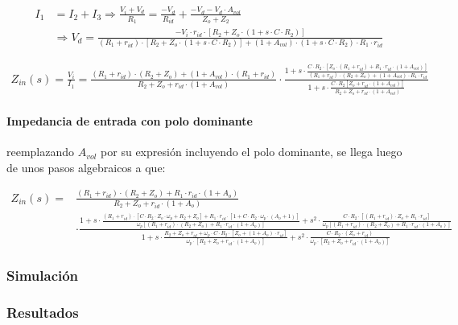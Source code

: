 \begin{align*}
	I_1 & = I_2 + I_3 \Rightarrow \frac{V_i + V_d}{R_1} = \frac{-V_d}{R_{id}} + \frac{-V_d - V_d \cdot A_{vol}}{Z_o + Z_2}\\
	& \Rightarrow
	V_d = \frac{- V_i \cdot r_{id} \cdot \left[ R_2 + Z_o \cdot (1 + s \cdot C \cdot R_2) \right]}{(R_1 + r_{id}) \cdot \left[R_2 + Z_o \cdot (1 + s \cdot C \cdot R_2) \right] + (1 + A_{vol}) \cdot ( 1 + s \cdot C \cdot R_2) \cdot R_1 \cdot r_{id}}
\end{align*}

\begin{align}
	Z_{in}(s) = \frac{V_i}{I_1} = \frac{(R_1 + r_{id}) \cdot (R_2 + Z_o) + (1 + A_{vol}) \cdot (R_1 + r_{id})}{R_2 + Z_o + r_{id} \cdot(1 + A_{vol})} \cdot \frac{1 + s \cdot \frac{C \cdot R_2 \cdot \left[ Z_o \cdot (R_1 + r_{id}) + R_1 \cdot r_{id} \cdot ( 1 + A_{vol}) \right]}{(R_1 + r_{id}) \cdot (R_2 + Z_o) + (1 + A_{vol}) \cdot R_1 \cdot r_{id}}}{1 + s \cdot \frac{C \cdot R_2 \left[ Z_o + r_{id} \cdot ( 1 + A_{vol}) \right]}{R_2 + Z_o + r_{id} \cdot ( 1 + A_{vol})}}
\end{align}

\paragraph*{Impedancia de entrada con polo dominante} reemplazando $A_{vol}$ por su expresi\'on incluyendo el polo dominante, se llega luego de unos pasos algebraicos a que:

\begin{align}
	Z_{in}(s) = & \frac{(R_1+r_{id})\cdot(R_2 + Z_o) + R_1 \cdot r_{id} \cdot(1+A_o)}{R_2 + Z_o + r_{id} \cdot(1 + A_o)} \\
	& \cdot \frac{1 + s \cdot \frac{(R_1 + r_{id}) \cdot \left[C \cdot R_2 \cdot Z_o \cdot \omega_p + R_2 + Z_o \right] + R_1 \cdot r_{id} \cdot \left[ 1 + C \cdot R_2 \cdot \omega_p \cdot (A_o + 1) \right] }{\omega_p \left[ (R_1 + r_{id}) \cdot (R_2 + Z_o) + R_1 \cdot r_{id} \cdot(1 + A_o) \right] } + s^{2} \cdot \frac{C \cdot R_2 \cdot \left[ (R_1 + r_{id}) \cdot Z_o + R_1 \cdot r_{id} \right] }{\omega_p \left[ (R_1 + r_{id}) \cdot (R_2 + Z_o) + R_1 \cdot r_{id} \cdot(1 + A_o) \right]}}{1 + s \cdot \frac{R_2 + Z_o + r_{id} + \omega_p \cdot C \cdot R_2 \cdot \left[ Z_o + (1 + A_o) \cdot r_{id} \right] }{\omega_p \cdot \left[ R_2 + Z_o + r_{id} \cdot(1 + A_o) \right] } + s^{2} \cdot \frac{C \cdot R_2 \cdot (Z_o + r_{id})}{\omega_p \cdot \left[ R_2 + Z_o + r_{id} \cdot(1 + A_o) \right] }}
\end{align}


\subsubsection{Simulaci\'on}
\subsubsection{Resultados}


